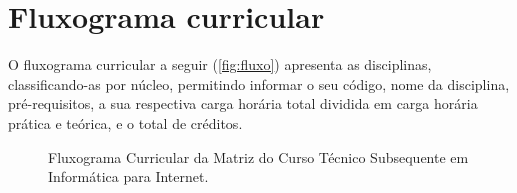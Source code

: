 \documentclass[
	12pt,				%
	openright,			%
	twoside,			%
	a4paper,			%
	chapter=TITLE,		%
	english,			%
	french,				%
	spanish,			%
	brazil,				%
	]{abntex2}
\begin{document}
\begin{landscape}
\begin{quadro}[h]
{\begin{tabularx}{1.6\textwidth}{c c X c c c c l}
\end{tabularx}

}{
}
\end{quadro}

\clearpage
\newpage



\end{landscape}

\section{Fluxograma curricular}

O fluxograma curricular a seguir (\autoref{fig:fluxo}) apresenta as disciplinas, classificando-as por núcleo, permitindo informar o seu código, nome da disciplina, pré-requisitos, a sua respectiva carga horária total dividida em carga horária prática e teórica, e o total de créditos. %

\begin{figure}[htpb]
   \caption{Fluxograma Curricular da Matriz do Curso Técnico Subsequente em Informática para Internet.}
    \label{fig:fluxo}
\end{figure}
\end{document}
